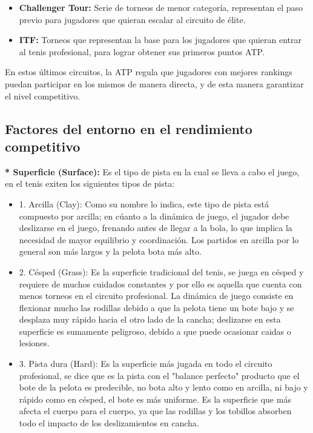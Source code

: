 \documentclass[oneside,11pt]{Latex/Classes/PhDthesisPSnPDF}
\begin{document}
\begin{itemize}
  \item \textbf{Challenger Tour:} Serie de torneos de menor categoría, representan el paso previo para jugadores que quieran escalar al circuito de élite.
  \item \textbf{ITF:} Torneos que representan la base para los jugadores que quieran entrar al tenis profesional, para lograr obtener sus primeros puntos ATP.
  \end{itemize}

\hfill\break
En estos últimos circuitos, la ATP regula que jugadores con mejores
rankings puedan participar en los mismos de manera directa, y de esta
manera garantizar el nivel competitivo.

\hfill\break

\subsection{ Factores del entorno en el rendimiento competitivo}

\textbf{* Superficie (Surface):} Es el tipo de pista en la cual se lleva
a cabo el juego, en el tenis exiten los siguientes tipos de pista:

\begin{itemize}
  \item 1. Arcilla (Clay): Como su nombre lo indica, este tipo de pista está compuesto por arcilla; en cúanto a la dinámica de juego, el jugador debe deslizarse en el juego, frenando antes de llegar a la bola, lo que implica la necesidad de mayor equilibrio y coordinación. Los partidos en arcilla por lo general son más largos y la pelota bota más alto.
  
  \item 2. Césped (Grass): Es la superficie tradicional del tenis, se juega en césped y requiere de muchos cuidados constantes y por ello es aquella que cuenta con menos torneos en el circuito profesional. La dinámica de juego consiste en flexionar mucho las rodillas debido a que la pelota tiene un bote bajo y se desplaza muy rápido hacia el otro lado de la cancha; deslizarse en esta superficie es sumamente peligroso, debido a que puede ocasionar caidas o lesiones.
  
  \item 3. Pista dura (Hard): Es la superficie más jugada en todo el circuito profesional, se dice que es la pista con el "balance perfecto" producto que el bote de la pelota es predecible, no bota alto y lento como en arcilla, ni bajo y rápido como en césped, el bote es más uniforme.  Es la superficie que más afecta el cuerpo para el cuerpo, ya que las rodillas y los tobillos absorben todo el impacto de los deslizamientos en cancha.
  \end{itemize}
\end{document}
